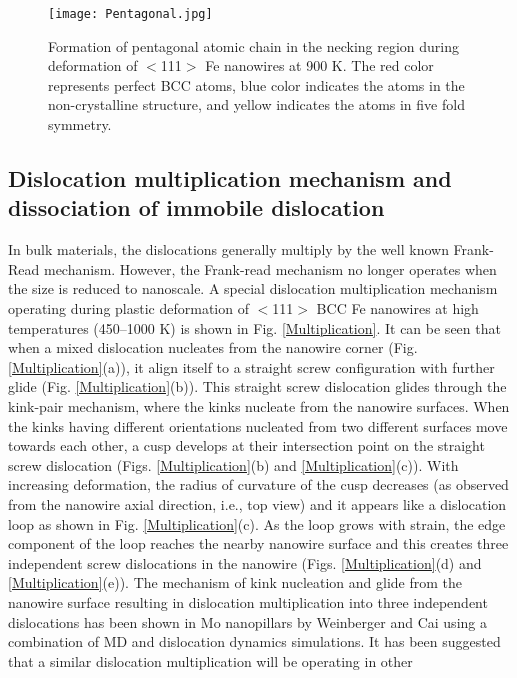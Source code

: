 \documentclass[%
reprint,%
 amssymb, amsmath,%
 aip,apl,%
]{revtex4-1}
\begin{document}
\begin{figure}
\centering
\texttt{[image: Pentagonal.jpg]}
\caption { Formation of pentagonal atomic chain in the necking region during deformation of $<$111$>$ Fe nanowires at 
900 K. The red color represents perfect BCC atoms, blue color indicates the atoms in the non-crystalline structure, and yellow 
indicates the atoms in five fold symmetry.}
\label{Pentagonal}
\end{figure}

\subsection{Dislocation multiplication mechanism and dissociation of immobile dislocation}

In bulk materials, the dislocations generally multiply by the well known Frank-Read mechanism. However, the Frank-read mechanism 
no longer operates when the size is reduced to nanoscale. A special dislocation multiplication mechanism operating during plastic 
deformation of $<$111$>$ BCC Fe nanowires at high temperatures (450–1000 K) is shown in Fig. \ref{Multiplication}. It can be seen 
that when a mixed dislocation nucleates from the nanowire corner (Fig. \ref{Multiplication}(a)), it align itself to a straight 
screw configuration with further glide (Fig. \ref{Multiplication}(b)). This straight screw dislocation glides through the kink-pair 
mechanism, where the kinks nucleate from the nanowire surfaces. When the kinks having different orientations nucleated from two 
different surfaces move towards each other, a cusp develops at their intersection point on the straight screw dislocation (Figs. 
\ref{Multiplication}(b) and \ref{Multiplication}(c)). With increasing deformation, the radius of curvature of the cusp decreases 
(as observed from the nanowire axial direction, i.e., top view) and it appears like a dislocation loop as shown in Fig. 
\ref{Multiplication}(c). As the loop grows with strain, the edge component of the loop reaches the nearby nanowire surface and this 
creates three independent screw dislocations in the nanowire (Figs. \ref{Multiplication}(d) and \ref{Multiplication}(e)). The 
mechanism of kink nucleation and glide from the nanowire surface resulting in dislocation multiplication into three independent 
dislocations has been shown in Mo nanopillars by Weinberger and Cai \cite{self-multiplication} using a combination of MD and 
dislocation dynamics simulations. It has been suggested that a similar dislocation multiplication will be operating in other 
\end{document}
